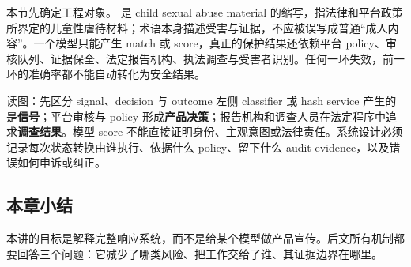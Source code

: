 本节先确定工程对象。 是 child sexual abuse material 的缩写，指法律和平台政策所界定的儿童性虐待材料；术语本身描述受害与证据，不应被误写成普通“成人内容”。一个模型只能产生 match 或 score，真正的保护结果还依赖平台 policy、审核队列、证据保全、法定报告机构、执法调查与受害者识别。任何一环失效，前一环的准确率都不能自动转化为安全结果。


\begin{knowledgebox}{读图：先区分 signal、decision 与 outcome}
左侧 classifier 或 hash service 产生的是\textbf{信号}；平台审核与 policy 形成\textbf{产品决策}；报告机构和调查人员在法定程序中追求\textbf{调查结果}。模型 score 不能直接证明身份、主观意图或法律责任。系统设计必须记录每次状态转换由谁执行、依据什么 policy、留下什么 audit evidence，以及错误如何申诉或纠正。
\end{knowledgebox}


\subsection{本章小结}

本讲的目标是解释完整响应系统，而不是给某个模型做产品宣传。后文所有机制都要回答三个问题：它减少了哪类风险、把工作交给了谁、其证据边界在哪里。


